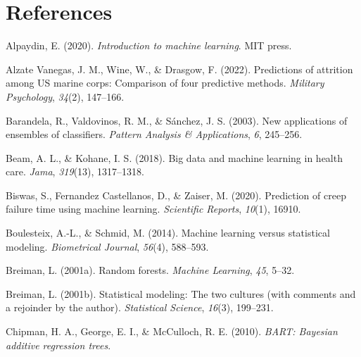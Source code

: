 \documentclass[
  man]{apa7}
\newlength{\cslhangindent}
\newlength{\cslentryspacingunit} %
\newenvironment{CSLReferences}[2] %
 {%
  \setlength{\parindent}{0pt}
  \ifodd #1
  \let\oldpar\par
  \def\par{\hangindent=\cslhangindent\oldpar}
  \fi
  \setlength{\parskip}{#2\cslentryspacingunit}
 }%
 {}
\begin{document}
\newpage

\hypertarget{references}{%
\section{References}\label{references}}

\begingroup
\setlength{\parindent}{-0.5in}
\setlength{\leftskip}{0.5in}

\hypertarget{refs}{}
\begin{CSLReferences}{1}{0}
\leavevmode{}%
Alpaydin, E. (2020). \emph{Introduction to machine learning}. MIT press.

\leavevmode{}%
Alzate Vanegas, J. M., Wine, W., \& Drasgow, F. (2022). Predictions of attrition among US marine corps: Comparison of four predictive methods. \emph{Military Psychology}, \emph{34}(2), 147--166.

\leavevmode{}%
Barandela, R., Valdovinos, R. M., \& Sánchez, J. S. (2003). New applications of ensembles of classifiers. \emph{Pattern Analysis \& Applications}, \emph{6}, 245--256.

\leavevmode{}%
Beam, A. L., \& Kohane, I. S. (2018). Big data and machine learning in health care. \emph{Jama}, \emph{319}(13), 1317--1318.

\leavevmode{}%
Biswas, S., Fernandez Castellanos, D., \& Zaiser, M. (2020). Prediction of creep failure time using machine learning. \emph{Scientific Reports}, \emph{10}(1), 16910.

\leavevmode{}%
Boulesteix, A.-L., \& Schmid, M. (2014). Machine learning versus statistical modeling. \emph{Biometrical Journal}, \emph{56}(4), 588--593.

\leavevmode{}%
Breiman, L. (2001a). Random forests. \emph{Machine Learning}, \emph{45}, 5--32.

\leavevmode{}%
Breiman, L. (2001b). Statistical modeling: The two cultures (with comments and a rejoinder by the author). \emph{Statistical Science}, \emph{16}(3), 199--231.

\leavevmode{}%
Chipman, H. A., George, E. I., \& McCulloch, R. E. (2010). \emph{BART: Bayesian additive regression trees}.


\end{CSLReferences}
\end{document}

